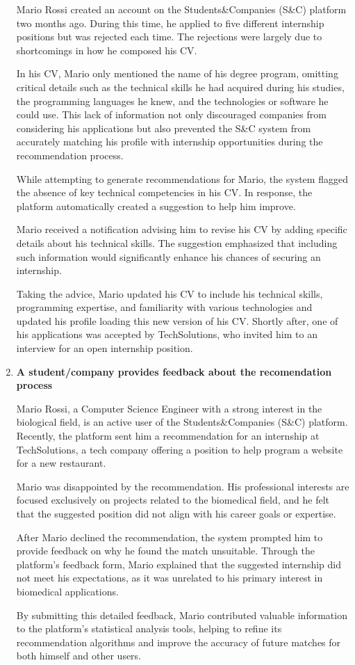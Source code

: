 \begin{enumerate}
     Mario Rossi created an account on the Students\&Companies (S\&C) platform two months ago. During this time, he applied to five different internship positions but was rejected each time. The rejections were largely due to shortcomings in how he composed his CV.

    In his CV, Mario only mentioned the name of his degree program, omitting critical details such as the technical skills he had acquired during his studies, the programming languages he knew, and the technologies or software he could use. This lack of information not only discouraged companies from considering his applications but also prevented the S\&C system from accurately matching his profile with internship opportunities during the recommendation process.

    While attempting to generate recommendations for Mario, the system flagged the absence of key technical competencies in his CV. In response, the platform automatically created a suggestion to help him improve.

    Mario received a notification advising him to revise his CV by adding specific details about his technical skills. The suggestion emphasized that including such information would significantly enhance his chances of securing an internship.

    Taking the advice, Mario updated his CV to include his technical skills, programming expertise, and familiarity with various technologies and updated his profile loading this new version of his CV. Shortly after, one of his applications was accepted by TechSolutions, who invited him to an interview for an open internship position.


     \item \textbf{A student/company provides feedback about the recomendation process}

     Mario Rossi, a Computer Science Engineer with a strong interest in the biological field, is an active user of the Students\&Companies (S\&C) platform. Recently, the platform sent him a recommendation for an internship at TechSolutions, a tech company offering a position to help program a website for a new restaurant.

    Mario was disappointed by the recommendation. His professional interests are focused exclusively on projects related to the biomedical field, and he felt that the suggested position did not align with his career goals or expertise.

    After Mario declined the recommendation, the system prompted him to provide feedback on why he found the match unsuitable. Through the platform's feedback form, Mario explained that the suggested internship did not meet his expectations, as it was unrelated to his primary interest in biomedical applications.

    By submitting this detailed feedback, Mario contributed valuable information to the platform’s statistical analysis tools, helping to refine its recommendation algorithms and improve the accuracy of future matches for both himself and other users.


      
\end{enumerate}

